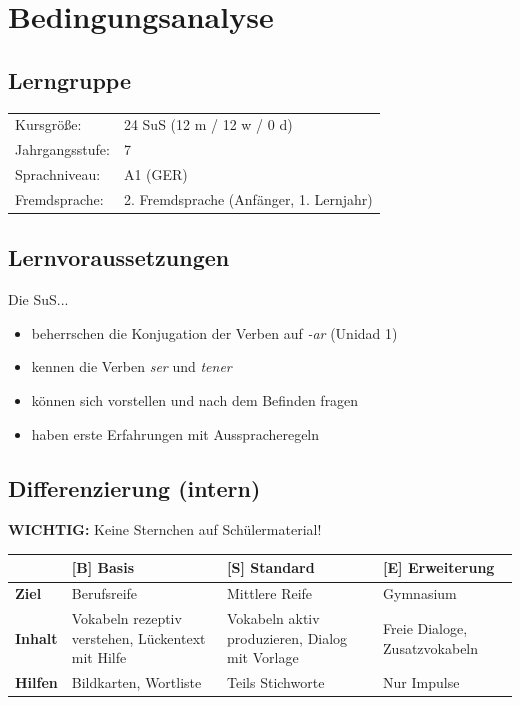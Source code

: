 \documentclass[11pt,a4paper]{article}
\newcommand{\jahrgangsstufe}{7}
\newcommand{\lerngruppengroesse}{24}
\newcommand{\maennlich}{12}
\newcommand{\weiblich}{12}
\newcommand{\divers}{0}
\newcommand{\gerniveau}{A1}
\begin{document}
\section{Bedingungsanalyse}

\subsection{Lerngruppe}
\begin{tabular}{ll}
    Kursgröße: & \lerngruppengroesse{} SuS (\maennlich{} m / \weiblich{} w / \divers{} d) \\
    Jahrgangsstufe: & \jahrgangsstufe \\
    Sprachniveau: & \gerniveau{} (GER) \\
    Fremdsprache: & 2. Fremdsprache (Anfänger, 1. Lernjahr) \\
\end{tabular}

\subsection{Lernvoraussetzungen}

Die SuS...
\begin{itemize}
    \item beherrschen die Konjugation der Verben auf \textit{-ar} (Unidad 1)
    \item kennen die Verben \textit{ser} und \textit{tener}
    \item können sich vorstellen und nach dem Befinden fragen
    \item haben erste Erfahrungen mit Ausspracheregeln
\end{itemize}

\subsection{Differenzierung (intern)}

\textbf{WICHTIG:} Keine Sternchen auf Schülermaterial!

\begin{tabular}{|l|p{4cm}|p{4cm}|p{4cm}|}
\hline
& \textbf{[B] Basis} & \textbf{[S] Standard} & \textbf{[E] Erweiterung} \\
\hline
\textbf{Ziel} & Berufsreife & Mittlere Reife & Gymnasium \\
\hline
\textbf{Inhalt} & Vokabeln rezeptiv verstehen, Lückentext mit Hilfe & Vokabeln aktiv produzieren, Dialog mit Vorlage & Freie Dialoge, Zusatzvokabeln \\
\hline
\textbf{Hilfen} & Bildkarten, Wortliste & Teils Stichworte & Nur Impulse \\
\hline
\end{tabular}
\end{document}
